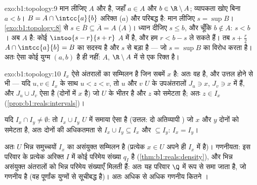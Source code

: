 \begin{solution}{exo:b1:topology:9}
मान लीजिए $A$  और  है, जहाँ $a \in A$ और $b \in \R \setminus A$;
व्यापकता खोए बिना $a < b$।  $B = A \cap \intcc{a}{b}$ अरिक्त ($a$) और
परिबद्ध है: मान लीजिए $s = \sup B$। \cref{exo:b1:topology:8} से $s \in
\overline B \subseteq \overline A = A$ ($A$ )। ध्यान दीजिए $s \leq b$,
और चूँकि $b \notin A$: $s < b$। अब $A$  है: कोई  $\intoo{s - r}{s
+ r}$ $A$ में है, और हम $r < b - s$ ले सकते हैं। तब $s + \frac{r}{2}$ $A
\cap \intcc{a}{b} = B$ का सदस्य है और $s$ से बड़ा है --- जो $s = \sup B$ का
विरोध करता है। अतः ऐसा कोई युग्म $(a, b)$ है ही नहीं: $A$, $\R \setminus A$
में से एक रिक्त है।
\end{solution}

\begin{solution}{exo:b1:topology:10}
$I_x$ ऐसे  अंतरालों का सम्मिलन है जिन सबमें $x$ है: अतः वह  है, और
उत्तल होने से  भी --- यदि $u, v \in I_x$ के साथ $u < z < v$, तो $u$ और
$v$ $U$ के  उपअंतरालों $J_u \ni x$, $J_v \ni x$ में हैं, और $J_u \cup
J_v$ ऐसा  है (दोनों में $x$ है) जो $U$ के भीतर है और $z$ को समेटता है;
अतः $z \in I_x$ (\cref{prop:b1:reals:intervals})।

यदि $I_x \cap I_y \neq \emptyset$: तो $I_x \cup I_y$ $U$ में समाया ऐसा 
 है (उत्तल: दो अतिव्यापी ) जो $x$ और $y$ दोनों को समेटता है, अतः
दोनों की अधिकतमता से $I_x \cup I_y \subseteq I_x$ और $\subseteq I_y$: $I_x =
I_y$।

अतः $U$ भिन्न समुच्चयों $I_x$ का असंयुक्त सम्मिलन है (प्रत्येक $x \in U$
अपने ही $I_x$ में है)। गणनीयता: इस परिवार के प्रत्येक अरिक्त  
$I$ में कोई परिमेय संख्या $q_I$ है (\cref{thm:b1:reals:density}), और भिन्न
असंयुक्त अंतरालों को भिन्न परिमेय संख्याएँ मिलती हैं: अतः यह परिवार $\Q$ में
 रूप से समा जाता है, जो गणनीय है (वह पूर्णांक युग्मों से सूचीबद्ध है)।
अतः अधिक से अधिक गणनीय कितने ।
\end{solution}

